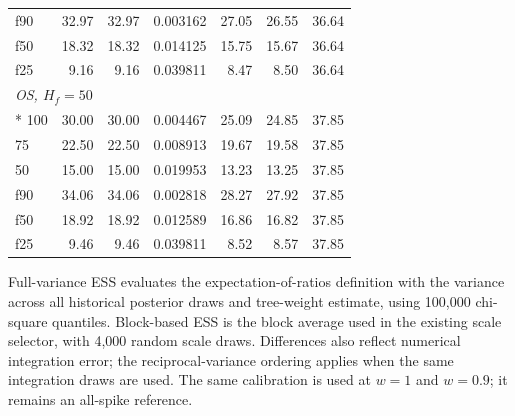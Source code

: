 \begin{landscape}
\begin{longtable}{lrrrrrr}
f90 & 32.97 & 32.97 & 0.003162 & 27.05 & 26.55 & 36.64 \\
f50 & 18.32 & 18.32 & 0.014125 & 15.75 & 15.67 & 36.64 \\
f25 & 9.16 & 9.16 & 0.039811 & 8.47 & 8.50 & 36.64 \\
\multicolumn{7}{l}{\strut\textit{OS, $H_f=50$}}\\*
100 & 30.00 & 30.00 & 0.004467 & 25.09 & 24.85 & 37.85 \\
75 & 22.50 & 22.50 & 0.008913 & 19.67 & 19.58 & 37.85 \\
50 & 15.00 & 15.00 & 0.019953 & 13.23 & 13.25 & 37.85 \\
f90 & 34.06 & 34.06 & 0.002818 & 28.27 & 27.92 & 37.85 \\
f50 & 18.92 & 18.92 & 0.012589 & 16.86 & 16.82 & 37.85 \\
f25 & 9.46 & 9.46 & 0.039811 & 8.52 & 8.57 & 37.85 \\
\end{longtable}
\noindent\begin{minipage}{\linewidth}\footnotesize Full-variance ESS evaluates the expectation-of-ratios definition with the variance across all historical posterior draws and tree-weight estimate, using 100,000 chi-square quantiles. Block-based ESS is the block average used in the existing scale selector, with 4,000 random scale draws. Differences also reflect numerical integration error; the reciprocal-variance ordering applies when the same integration draws are used. The same calibration is used at $w=1$ and $w=0.9$; it remains an all-spike reference.\end{minipage}
\endgroup
\end{landscape}
